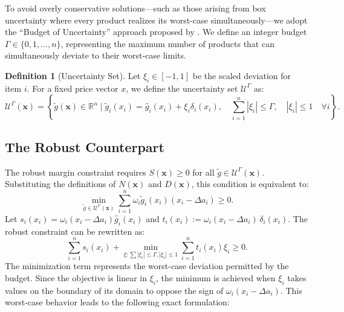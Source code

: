 \documentclass[11pt, a4paper]{article}
\theoremstyle{plain}
\theoremstyle{definition}
\newtheorem{definition}[definition]{Definition}
\theoremstyle{remark}
\begin{document}
To avoid overly conservative solutions—such as those arising from box uncertainty where every product realizes its worst-case simultaneously—we adopt the ``Budget of Uncertainty'' approach proposed by \citet{BertsimasSim2004}. We define an integer budget $\Gamma \in \{0,1,\dots,n\}$, representing the maximum number of products that can simultaneously deviate to their worst-case limits.

\begin{definition}[Uncertainty Set]
Let $\xi_i \in [-1, 1]$ be the scaled deviation for item $i$. For a fixed price vector $x$, we define the uncertainty set $\mathcal{U}^\Gamma$ as:
\begin{equation}
    \mathcal{U}^\Gamma(\bm{x}) = \left\{ \tilde{g}(\bm{x}) \in \mathbb{R}^n \;\bigg|\; \tilde{g}_i(x_i) = \hat{g}_i(x_i) + \xi_i \delta_i(x_i), \quad \sum_{i=1}^n |\xi_i| \le \Gamma, \quad |\xi_i| \le 1 \quad \forall i \right\}.
\end{equation}
\end{definition}

\subsection{The Robust Counterpart}
The robust margin constraint requires $S(\bm{x}) \ge 0$ for all $\tilde{g} \in \mathcal{U}^\Gamma(\bm{x})$. Substituting the definitions of $N(\bm{x})$ and $D(\bm{x})$, this condition is equivalent to:
\begin{equation}\label{eq:robust_raw}
    \min_{\tilde{g} \in \mathcal{U}^\Gamma(\bm{x})} \sum_{i=1}^n \omega_i \tilde{g}_i(x_i) (x_i - \Delta a_i) \ge 0.
\end{equation}
Let $s_i(x_i)=\omega_{i} \left( x_{i}-\Delta a_{i} \right) \hat{g}_{i} \left( x_{i} \right)$ and $t_i(x_i):=\omega_i(x_i-\Delta a_i)\,\delta_i(x_i).$ The robust constraint can be rewritten as:
\begin{equation}\label{eq:robust_st}
    \sum_{i=1}^n s_i(x_i) + \min_{\xi : \sum |\xi_i| \le \Gamma, |\xi_i| \le 1} \sum_{i=1}^n t_i(x_i) \xi_i \ge 0.
\end{equation}
The minimization term represents the worst-case deviation permitted by the budget. Since the objective is linear in $\xi_i$, the minimum is achieved when $\xi_i$ takes values on the boundary of its domain to oppose the sign of $\omega_i(x_i-\Delta a_i)$. This worst-case behavior leads to the following exact formulation:
\end{document}
